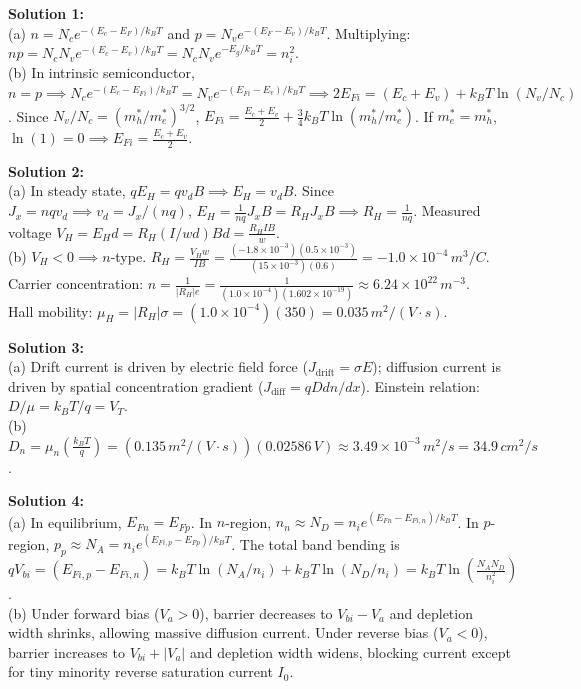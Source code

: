 \begin{solutionbox}
\textbf{Solution 1:}\\
(a) $n = N_c e^{-(E_c - E_F)/k_B T}$ and $p = N_v e^{-(E_F - E_v)/k_B T}$. Multiplying: $np = N_c N_v e^{-(E_c - E_v)/k_B T} = N_c N_v e^{-E_g / k_B T} = n_i^2$.\\
(b) In intrinsic semiconductor, $n=p \implies N_c e^{-(E_c - E_{Fi})/k_B T} = N_v e^{-(E_{Fi} - E_v)/k_B T} \implies 2E_{Fi} = (E_c + E_v) + k_B T \ln(N_v/N_c)$. Since $N_v/N_c = (m_h^*/m_e^*)^{3/2}$, $E_{Fi} = \frac{E_c+E_v}{2} + \frac{3}{4}k_B T \ln(m_h^*/m_e^*)$. If $m_e^* = m_h^*$, $\ln(1)=0 \implies E_{Fi} = \frac{E_c+E_v}{2}$.

\vspace{0.3cm}
\textbf{Solution 2:}\\
(a) In steady state, $q E_H = q v_d B \implies E_H = v_d B$. Since $J_x = n q v_d \implies v_d = J_x / (nq)$, $E_H = \frac{1}{nq} J_x B = R_H J_x B \implies R_H = \frac{1}{nq}$. Measured voltage $V_H = E_H d = R_H (I/wd) B d = \frac{R_H I B}{w}$.\\
(b) $V_H < 0 \implies n$-type. $R_H = \frac{V_H w}{I B} = \frac{(-1.8 \times 10^{-3})(0.5 \times 10^{-3})}{(15 \times 10^{-3})(0.6)} = -1.0 \times 10^{-4}\,\si{m^3/C}$.\\
Carrier concentration: $n = \frac{1}{|R_H|e} = \frac{1}{(1.0 \times 10^{-4})(1.602 \times 10^{-19})} \approx 6.24 \times 10^{22}\,\si{m^{-3}}$.\\
Hall mobility: $\mu_H = |R_H|\sigma = (1.0 \times 10^{-4})(350) = 0.035\,\si{m^2/(V\cdot s)}$.

\vspace{0.3cm}
\textbf{Solution 3:}\\
(a) Drift current is driven by electric field force ($J_{\text{drift}} = \sigma E$); diffusion current is driven by spatial concentration gradient ($J_{\text{diff}} = q D dn/dx$). Einstein relation: $D/\mu = k_B T / q = V_T$.\\
(b) $D_n = \mu_n \left(\frac{k_B T}{q}\right) = (0.135\,\si{m^2/(V\cdot s)})(0.02586\,\si{V}) \approx 3.49 \times 10^{-3}\,\si{m^2/s} = 34.9\,\si{cm^2/s}$.

\vspace{0.3cm}
\textbf{Solution 4:}\\
(a) In equilibrium, $E_{Fn} = E_{Fp}$. In $n$-region, $n_n \approx N_D = n_i e^{(E_{Fn}-E_{Fi,n})/k_B T}$. In $p$-region, $p_p \approx N_A = n_i e^{(E_{Fi,p}-E_{Fp})/k_B T}$. The total band bending is $q V_{bi} = (E_{Fi,p} - E_{Fi,n}) = k_B T \ln(N_A/n_i) + k_B T \ln(N_D/n_i) = k_B T \ln\left(\frac{N_A N_D}{n_i^2}\right)$.\\
(b) Under forward bias ($V_a > 0$), barrier decreases to $V_{bi} - V_a$ and depletion width shrinks, allowing massive diffusion current. Under reverse bias ($V_a < 0$), barrier increases to $V_{bi} + |V_a|$ and depletion width widens, blocking current except for tiny minority reverse saturation current $I_0$.
\end{solutionbox}
